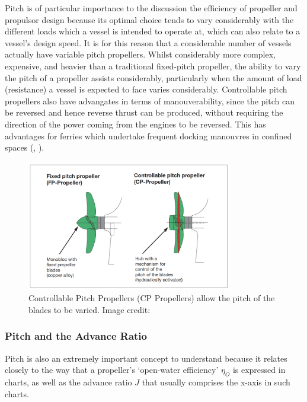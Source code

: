 \documentclass{article}\usepackage[]{graphicx}\usepackage[]{color}
\begin{document}
Pitch is of particular importance to the discussion the efficiency of propeller and propulsor design because its optimal choice tends to vary considerably with the different loads which a vessel is intended to operate at, which can also relate to a vessel's design speed.  It is for this reason that a considerable number of vessels actually have variable pitch propellers.  Whilst considerably more complex, expensive, and heavier than a traditional fixed-pitch propeller, the ability to vary the pitch of a propeller assists considerably, particularly when the amount of load (resistance) a vessel is expected to face varies considerably.  Controllable pitch propellers also have advangates in terms of manouverability, since the pitch can be reversed and hence reverse thrust can be produced, without requiring the direction of the power coming from the engines to be reversed.  This has advantages for ferries which undertake frequent docking manouvres in confined spaces (\cite{MAN2017}, \cite{lewis1988}).

\begin{figure}[h]
\captionsetup{width=0.8\textwidth}
\includegraphics[width=0.8\textwidth, center]{CPPropeller.png}
\caption{Controllable Pitch Propellers (CP Propellers) allow the pitch of the blades to be varied. Image credit: \parencite{mollard2011}}
\label{fig:CPPropeller.png}
\end{figure}

\subsubsection{Pitch and the Advance Ratio}
Pitch is also an extremely important concept to understand because it relates closely to the way that a propeller's `open-water efficiency' $\eta_O$ is expressed in charts, as well as the advance ratio $J$ that usually comprises the x-axis in such charts.
\end{document}
